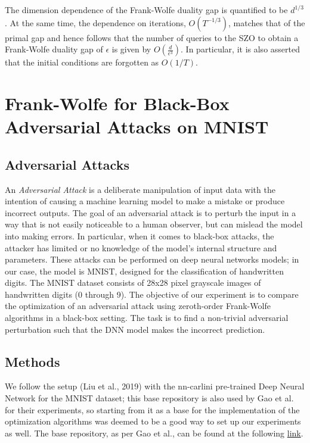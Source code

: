 \documentclass[10pt,twocolumn,letterpaper]{article}
\begin{document}
The dimension dependence of the Frank-Wolfe duality gap is quantified to be $d^{1 / 3}$.
At the same time, the dependence on iterations, $O\left(T^{-1 / 3}\right)$, matches
that of the primal gap and hence follows that the number of queries to the SZO to obtain a Frank-Wolfe 
duality gap of $\epsilon$ is given by $O\left(\frac{d}{\epsilon^{3}}\right)$. 
In particular, it is also asserted that the initial conditions 
are forgotten as $O(1 / T)$.

\section{Frank-Wolfe for Black-Box Adversarial Attacks on MNIST}

\subsection{Adversarial Attacks}

An \textit{Adversarial Attack} is a deliberate manipulation of input data with the 
intention of causing a machine learning model to make a mistake or produce 
incorrect outputs. The goal of an adversarial attack is to perturb 
the input in a way that is not easily noticeable to a human observer,
but can mislead the model into making errors. In particular, when it comes
to black-box attacks, the attacker has limited or no knowledge of the 
model's internal structure and parameters. These attacks can be performed on
deep neural networks models; in our case, the model is MNIST, designed for the
classification of handwritten digits. 
The MNIST dataset consists of 28x28 pixel grayscale images of handwritten digits (0 through 9).
The objective of our experiment is to compare the optimization of an adversarial attack using
zeroth-order Frank-Wolfe algorithms in a black-box setting.
The task is to find a non-trivial adversarial perturbation such that the DNN model
makes the incorrect prediction.

\subsection{Methods}

We follow the setup (Liu et al., 2019) with the nn-carlini pre-trained Deep Neural Network for
the MNIST dataset; this base repository is also used by Gao et al.\cite{Gao} for their experiments, so starting
from it as a base for the implementation of the optimization algorithms was deemed to be a good
way to set up our experiments as well. The base repository, as per Gao et al., can be found
at the following \href{https://github.com/IBM/ZOSVRG-BlackBox-Adv}{link}.
\end{document}
